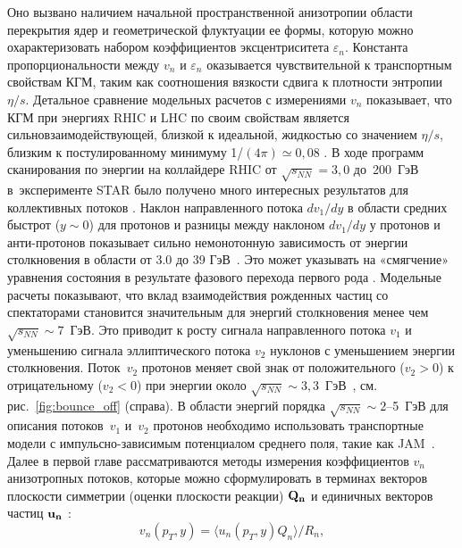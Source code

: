 Оно вызвано наличием начальной пространственной анизотропии области перекрытия ядер и геометрической флуктуации ее формы, которую можно охарактеризовать набором коэффициентов эксцентриситета $\varepsilon_n$.
Константа пропорциональности между $v_n$  и $\varepsilon_n$ оказывается чувствительной к транспортным свойствам КГМ, таким как соотношения вязкости сдвига к плотности энтропии $\eta/s$.
Детальное сравнение модельных расчетов с измерениями $v_n$ показывает, что КГМ при энергиях RHIC и LHC по своим свойствам является сильновзаимодействующей, близкой к идеальной, жидкостью со значением $\eta/s$, близким к постулированному минимуму 1/$(4\pi) \simeq 0{,}08$ \cite{eos2024,taranenko}.
В ходе программ сканирования по энергии на коллайдере RHIC от $\sqrt{s_{NN}} = 3{,}0$ до~200~ГэВ в~эксперименте STAR было получено много 
интересных результатов для коллективных потоков \cite{star3gev,STAR:2020dav,v1bes}.
Наклон направленного потока $dv_1/dy$ в области средних быстрот ($y \sim 0$) для протонов и разницы между наклоном $dv_1/dy$ у протонов и анти-протонов показывает сильно немонотонную зависимость от энергии столкновения в области от 3.0 до 39 ГэВ~\cite{v1bes}. 
Это может указывать на «смягчение» уравнения состояния в результате фазового перехода первого рода \cite{taranenko}. 
Модельные расчеты показывают, что вклад взаимодействия рожденных частиц со спектаторами становится значительным для
энергий столкновения менее чем $\sqrt{s_{NN}}\sim 7$~ГэВ. 
Это приводит к росту сигнала направленного потока $v_1$ и уменьшению сигнала эллиптического потока $v_2$ нуклонов с уменьшением энергии столкновения. 
Поток~$v_2$ протонов меняет свой знак  от положительного ($v_2>0$) к отрицательному ($v_2<0$) при энергии около $\sqrt{s_{NN}}\sim 3{,}3$~ГэВ~\cite{E895:2000maf,E895:2001axb}, см. рис.~\ref{fig:bounce_off} (справа). 
В области энергий порядка $\sqrt{s_{NN}}\sim 2$--5~ГэВ для описания потоков~$v_1$ и~$v_2$ протонов необходимо использовать транспортные модели с
импульсно-зависимым потенциалом среднего поля, такие как JAM~\cite{nara2019jam}.\\
Далее в первой главе   рассматриваются методы измерения коэффициентов  $v_n$ анизотропных потоков, которые можно сформулировать
в терминах векторов плоскости симметрии (оценки плоскости реакции) ${\bf Q_n}$ и единичных векторов частиц ${\bf u_n}$ \cite{Voloshin:2008dg,Selyuzhenkov:2007zi}:\\
\begin{equation}
    v_n(p_T, y)  =  \langle u_n (p_T, y) Q_n \rangle/R_n, \label{eq:v1_formula}
\end{equation}
